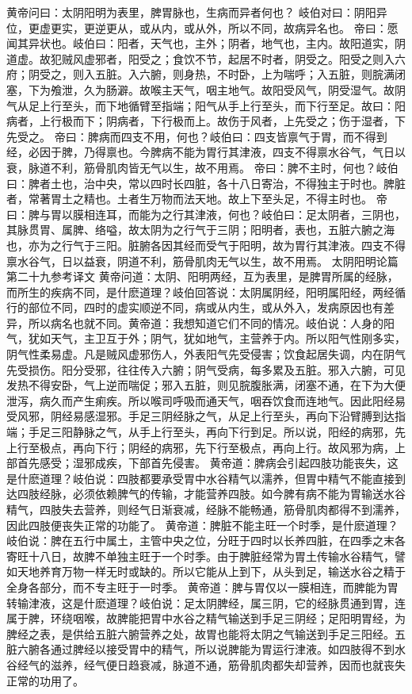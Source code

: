 \documentclass[a4paper,12pt,UTF8,twoside]{ctexbook}
\begin{document}
黄帝问曰：太阴阳明为表里，脾胃脉也，生病而异者何也？
岐伯对曰：阴阳异位，更虚更实，更逆更从，或从内，或从外，所以不同，故病异名也。
帝曰：愿闻其异状也。岐伯曰：阳者，天气也，主外；阴者，地气也，主内。故阳道实，阴道虚。故犯贼风虚邪者，阳受之；食饮不节，起居不时者，阴受之。阳受之则入六府；阴受之，则入五脏。入六腑，则身热，不时卧，上为喘呼；入五脏，则脘满闭塞，下为飧泄，久为肠澼。故喉主天气，咽主地气。故阳受风气，阴受湿气。故阴气从足上行至头，而下地循臂至指端；阳气从手上行至头，而下行至足。故曰：阳病者，上行极而下；阴病者，下行极而上。故伤于风者，上先受之；伤于湿者，下先受之。
帝曰：脾病而四支不用，何也？岐伯曰：四支皆禀气于胃，而不得到经，必因于脾，乃得禀也。今脾病不能为胃行其津液，四支不得禀水谷气，气日以衰，脉道不利，筋骨肌肉皆无气以生，故不用焉。
帝曰：脾不主时，何也？岐伯曰：脾者土也，治中央，常以四时长四脏，各十八日寄治，不得独主于时也。脾脏者，常著胃土之精也。土者生万物而法天地。故上下至头足，不得主时也。
帝曰：脾与胃以膜相连耳，而能为之行其津液，何也？岐伯曰：足太阴者，三阴也，其脉贯胃、属脾、络嗌，故太阴为之行气于三阴；阳明者，表也，五脏六腑之海也，亦为之行气于三阳。脏腑各因其经而受气于阳明，故为胃行其津液。四支不得禀水谷气，日以益衰，阴道不利，筋骨肌肉无气以生，故不用焉。
太阴阳明论篇第二十九参考译文
黄帝问道：太阴、阳明两经，互为表里，是脾胃所属的经脉，而所生的疾病不同，是什麽道理？岐伯回答说：太阴属阴经，阳明属阳经，两经循行的部位不同，四时的虚实顺逆不同，病或从内生，或从外入，发病原因也有差异，所以病名也就不同。黄帝道：我想知道它们不同的情况。岐伯说：人身的阳气，犹如天气，主卫互于外；阴气，犹如地气，主营养于内。所以阳气性刚多实，阴气性柔易虚。凡是贼风虚邪伤人，外表阳气先受侵害；饮食起居失调，内在阴气先受损伤。阳分受邪，往往传入六腑；阴气受病，每多累及五脏。邪入六腑，可见发热不得安卧，气上逆而喘促；邪入五脏，则见脘腹胀满，闭塞不通，在下为大便泄泻，病久而产生痢疾。所以喉司呼吸而通天气，咽吞饮食而连地气。因此阳经易受风邪，阴经易感湿邪。手足三阴经脉之气，从足上行至头，再向下沿臂膊到达指端；手足三阳静脉之气，从手上行至头，再向下行到足。所以说，阳经的病邪，先上行至极点，再向下行；阴经的病邪，先下行至极点，再向上行。故风邪为病，上部首先感受；湿邪成疾，下部首先侵害。
黄帝道：脾病会引起四肢功能丧失，这是什麽道理？岐伯说：四肢都要承受胃中水谷精气以濡养，但胃中精气不能直接到达四肢经脉，必须依赖脾气的传输，才能营养四肢。如今脾有病不能为胃输送水谷精气，四肢失去营养，则经气日渐衰减，经脉不能畅通，筋骨肌肉都得不到濡养，因此四肢便丧失正常的功能了。
黄帝道：脾脏不能主旺一个时季，是什麽道理？岐伯说：脾在五行中属土，主管中央之位，分旺于四时以长养四脏，在四季之末各寄旺十八日，故脾不单独主旺于一个时季。由于脾脏经常为胃土传输水谷精气，譬如天地养育万物一样无时或缺的。所以它能从上到下，从头到足，输送水谷之精于全身各部分，而不专主旺于一时季。
黄帝道：脾与胃仅以一膜相连，而脾能为胃转输津液，这是什麽道理？岐伯说：足太阴脾经，属三阴，它的经脉贯通到胃，连属于脾，环绕咽喉，故脾能把胃中水谷之精气输送到手足三阴经；足阳明胃经，为脾经之表，是供给五脏六腑营养之处，故胃也能将太阴之气输送到手足三阳经。五脏六腑各通过脾经以接受胃中的精气，所以说脾能为胃运行津液。如四肢得不到水谷经气的滋养，经气便日趋衰减，脉道不通，筋骨肌肉都失却营养，因而也就丧失正常的功用了。
\end{document}

